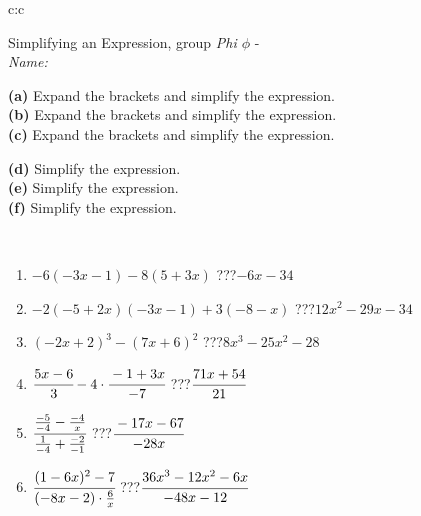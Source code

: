 \documentclass[10pt]{report}
\begin{document}
\newpage
\thispagestyle{empty}
\begin{tabular}{c:c}
\begin{minipage}[c][104.5mm][t]{0.5\linewidth}
\begin{center}
\vspace{7mm}
{\huge Simplifying an Expression, group \textit{Phi $\phi$} -}\\[5mm]
\textit{Name:}\phantom{xxxxxxxxxxxxxxxxxxxxxxxxxxxxxxxxxxxxxxxxxxxxxxxxxxxxxxxxxxxxxxxxx}\\[5mm]
\begin{minipage}{0.95\linewidth}
\begin{center}
{\small \begin{minipage}{0.6\textwidth}
\textbf{(a)} Expand the brackets and simplify the expression. \\[1mm]
\textbf{(b)} Expand the brackets and simplify the expression. \\[1mm]
\textbf{(c)} Expand the brackets and simplify the expression.
\end{minipage} \begin{minipage}{0.39\textwidth}
\textbf{(d)} Simplify the expression. \\[1mm]
\textbf{(e)} Simplify the expression. \\[1mm]
\textbf{(f)} Simplify the expression.
\end{minipage}
}
\end{center}
\end{minipage}
\\[4mm]
\begin{minipage}{0.79\linewidth}
\begin{center}
\begin{varwidth}{\linewidth}
\begin{enumerate}
\normalsize
\item $-6(-3x-1)-8(5+3x)$\quad \dotfill\; ???\;\dotfill \quad $-6x-34$
\item $-2(-5+2x)(-3x-1)+3(-8-x)$\quad \dotfill\; ???\;\dotfill \quad $12x^2-29x-34$
\item $(-2x+2)^3-(7x+6)^2$\quad \dotfill\; ???\;\dotfill \quad $8x^3-25x^2-28$
\item $\cfrac{5x-6}{3}-4\cdot\cfrac{-1+3x}{-7}$\quad \dotfill\; ???\;\dotfill \quad $\cfrac{71x+54}{21}$
\item $\cfrac{\frac{-5}{-4}-\frac{-4}{x}}{\frac{1}{-4}+\frac{-2}{-1}}$\quad \dotfill\; ???\;\dotfill \quad $\cfrac{-17x-67}{-28x}$
\item $\cfrac{(1-6x)^2-7}{(-8x-2)\cdot\frac{6}{x}}$\quad \dotfill\; ???\;\dotfill \quad $\cfrac{36x^3-12x^2-6x}{-48x-12}$

\end{enumerate}
\end{varwidth}
\end{center}
\end{minipage}
\end{center}
\end{minipage}
\end{tabular}
\end{document}
